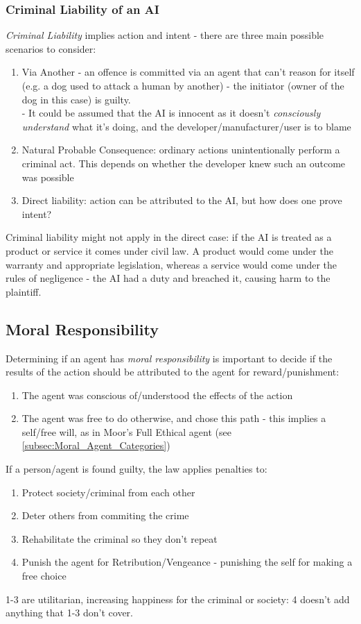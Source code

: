 \subsubsection{Criminal Liability of an AI}
\emph{Criminal Liability} implies action and intent - there are three main possible scenarios to consider:
\begin{enumerate}
    \item Via Another - an offence is committed via an agent that can't reason for itself (e.g. a dog used to attack a human by another) - the initiator (owner of the dog in this case) is guilty.\\
    \qquad - It could be assumed that the AI is innocent as it doesn't \emph{consciously understand} what it's doing, and the developer/manufacturer/user is to blame
    \item Natural Probable Consequence: ordinary actions unintentionally perform a criminal act. This depends on whether the developer knew such an outcome was possible
    \item Direct liability: action can be attributed to the AI, but how does one prove intent?  
\end{enumerate}
Criminal liability might not apply in the direct case: if the AI is treated as a product or service it comes under civil law. A product would come under the warranty and appropriate legislation, whereas a service would come under the rules of negligence - the AI had a duty and breached it, causing harm to the plaintiff. 

\subsection{Moral Responsibility}
Determining if an agent has \emph{moral responsibility} is important to decide if the results of the action should be attributed to the agent for reward/punishment:
\begin{enumerate}
    \item The agent was conscious of/understood the effects of the action
    \item The agent was free to do otherwise, and chose this path - this implies a self/free will, as in Moor's Full Ethical agent (see \ref{subsec:Moral_Agent_Categories})
\end{enumerate}

If a person/agent is found guilty, the law applies penalties to:
\begin{enumerate}
    \item Protect society/criminal from each other
    \item Deter others from commiting the crime
    \item Rehabilitate the criminal so they don't repeat
    \item Punish the agent for Retribution/Vengeance - punishing the self for making a free choice
 \end{enumerate}
 1-3 are utilitarian, increasing happiness for the criminal or society: 4 doesn't add anything that 1-3 don't cover. 
 
